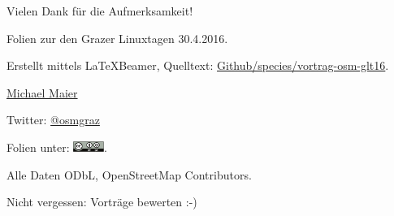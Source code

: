 \documentclass{beamer}
\begin{document}
\begin{frame}{Vielen Dank für die Aufmerksamkeit!}

  Folien zur den Grazer Linuxtagen 30.4.2016.
\vspace{0.8cm}

Erstellt mittels \LaTeX Beamer, Quelltext: \href{https://github.com/species/vortrag-osm-glt16}{Github/species/vortrag-osm-glt16}.
\vspace{0.8cm}

\href{mailto:michael.maier@mailbox.org}{Michael Maier}

Twitter: \href{https://twitter.com/osmgraz}{@osmgraz}
\vspace{0.8cm}

Folien unter: \includegraphics[width=1cm]{cc-by-sa.pdf}. 

Alle Daten ODbL, OpenStreetMap Contributors.

\vspace{0.8cm}

Nicht vergessen: Vorträge bewerten :-)


\end{frame}
\end{document}
